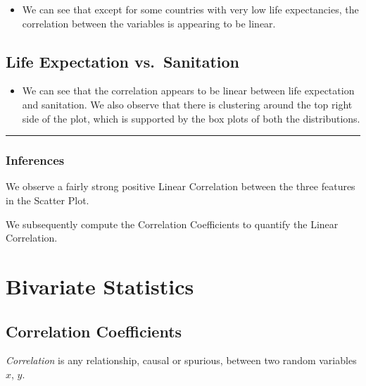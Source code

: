 \documentclass[
]{article}
\providecommand{\tightlist}{%
  \setlength{\itemsep}{0pt}\setlength{\parskip}{0pt}}\usepackage{longtable,booktabs,array}
\begin{document}
\begin{itemize}
\tightlist
\item
  We can see that except for some countries with very low life
  expectancies, the correlation between the variables is appearing to be
  linear.
\end{itemize}

\hypertarget{life-expectation-vs.-sanitation}{%
\subsection{Life Expectation
vs.~Sanitation}\label{life-expectation-vs.-sanitation}}

\begin{itemize}
\tightlist
\item
  We can see that the correlation appears to be linear between life
  expectation and sanitation. We also observe that there is clustering
  around the top right side of the plot, which is supported by the box
  plots of both the distributions.
\end{itemize}

\begin{center}\rule{0.5\linewidth}{0.5pt}\end{center}

\hypertarget{inferences}{%
\subsubsection{Inferences}\label{inferences}}

We observe a fairly strong positive Linear Correlation between the three
features in the Scatter Plot.

We subsequently compute the Correlation Coefficients to quantify the
Linear Correlation.

\hypertarget{bivariate-statistics}{%
\section{Bivariate Statistics}\label{bivariate-statistics}}

\hypertarget{correlation-coefficients}{%
\subsection{Correlation Coefficients}\label{correlation-coefficients}}

\emph{Correlation} is any relationship, causal or spurious, between two
random variables \(x\), \(y\).
\end{document}

